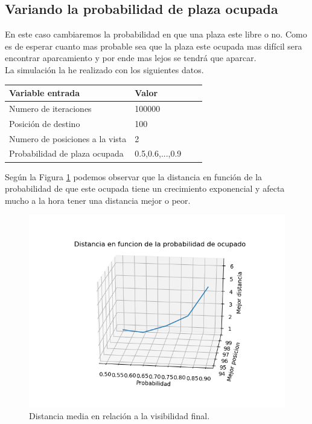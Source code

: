 \documentclass[12pt,a4paper]{article}
\begin{document}
\subsection{Variando la probabilidad de plaza ocupada}
En este caso cambiaremos la probabilidad en que una plaza este libre o no. Como es de esperar cuanto mas probable sea que la plaza este ocupada mas difícil sera encontrar aparcamiento y por ende mas lejos se tendrá que aparcar.\\La simulación la he realizado con los siguientes datos.
\begin{table}[H]
	\centering
	\begin{tabular}{|l|l|l|l|}
		\hline
		\textbf{Variable entrada} & \textbf{Valor}\\ \hline
		Numero de iteraciones&100000\\ \hline
		Posición de destino&100\\ \hline
		Numero de posiciones a la vista&2\\ \hline
		Probabilidad de plaza ocupada&0.5,0.6,...,0.9\\ \hline
	\end{tabular}
\end{table}
Según la Figura \ref{fig:distProbabilidad} podemos observar que la distancia en función de la probabilidad de que este ocupada tiene un crecimiento exponencial y afecta mucho a la hora tener una distancia mejor o peor. 
\begin{figure}[H]
	\centering
	\includegraphics{images/probabilidad.png}
	\caption{Distancia media en relación a la visibilidad final.}
	\label{fig:distProbabilidad}
\end{figure}
\end{document}
